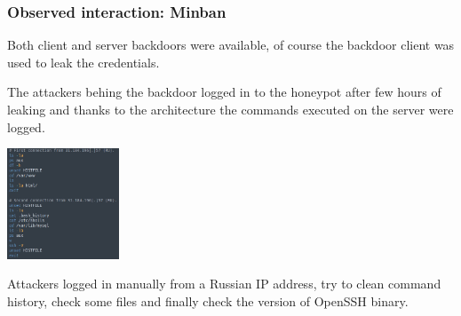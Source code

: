 \begin{frame}
	\frametitle{Observed interaction: Minban}
	
	Both client and server backdoors were available, of course the backdoor client was used to leak the credentials.
	
	\smallskip
	
	The attackers behing the backdoor logged in to the honeypot after few hours of leaking and thanks to the architecture the commands executed on the server were logged.
	
	\smallskip
	
  \begin{center}    
  \includegraphics[width=0.25\textwidth]{images/minban}
  \end{center}
  
	\smallskip
	
  Attackers logged in manually from a Russian IP address, try to clean command history, check some files and finally check the version of OpenSSH binary.  

\end{frame}


